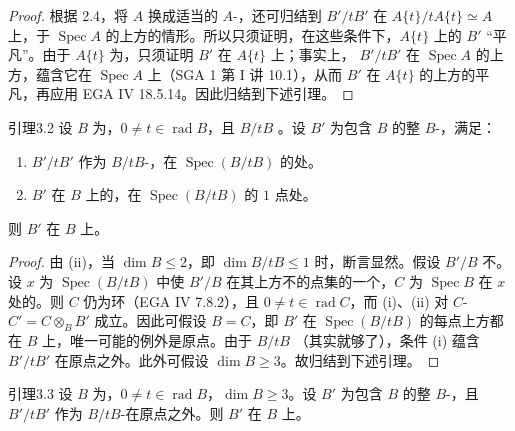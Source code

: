 \begin{proof}
根据 2.4，将 $A$ 换成适当的 $A$-，还可归结到 $B'/tB'$ 在 $A\{t\}/tA\{t\}\simeq A$ 上，于 $\operatorname{Spec}A$ 的上方的情形。所以只须证明，在这些条件下，$A\{t\}$ 上的 $B'$ “平凡”。由于 $A\{t\}$ 为，只须证明
$B'$ 在 $A\{t\}$ 上；事实上， $B'/tB'$ 在 $\operatorname{Spec}A$ 的上方，蕴含它在 $\operatorname{Spec}A$ 上（SGA 1 第 I 讲 10.1），从而 $B'$ 在 $A\{t\}$ 的上方的平凡，再应用 EGA IV 18.5.14。因此归结到下述引理。
\end{proof}
\begin{SGAresult}{引理}{3.2}
设 $B$ 为，$0\ne t\in\operatorname{rad}B$，且 $B/tB$ 。设 $B'$ 为包含 $B$ 的整 $B$-，满足：
\begin{enumerate}
\item[(i)] $B'/tB'$ 作为 $B/tB$-，在 $\operatorname{Spec}(B/tB)$ 的处。
\item[(ii)] $B'$ 在 $B$ 上的，在 $\operatorname{Spec}(B/tB)$ 的 $1$ 点处。
\end{enumerate}
则 $B'$ 在 $B$ 上。
\end{SGAresult}
\begin{proof}
由 (ii)，当 $\dim B\leq2$，即 $\dim B/tB\leq1$ 时，断言显然。假设 $B'/B$ 不。设 $x$ 为 $\operatorname{Spec}(B/tB)$ 中使 $B'/B$ 在其上方不的点集的一个，$C$ 为 $\operatorname{Spec}B$ 在 $x$ 处的。则 $C$ 仍为环（EGA IV 7.8.2），且 $0\ne t\in\operatorname{rad}C$，而 (i)、(ii) 对 $C$- $C'=C\otimes_B B'$ 成立。因此可假设 $B=C$，即 $B'$ 在 $\operatorname{Spec}(B/tB)$ 的每点上方都在 $B$ 上，唯一可能的例外是原点。由于 $B/tB$ （其实就够了），条件 (i) 蕴含 $B'/tB'$ 在原点之外。此外可假设 $\dim B\geq3$。故归结到下述引理。
\end{proof}
\begin{SGAresult}{引理}{3.3}
设 $B$ 为，$0\ne t\in\operatorname{rad}B$，$\dim B\geq3$。设 $B'$ 为包含 $B$ 的整 $B$-，且 $B'/tB'$ 作为 $B/tB$-在原点之外。则 $B'$ 在 $B$ 上。
\end{SGAresult}
